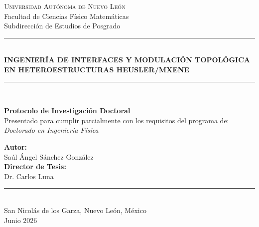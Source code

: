 \documentclass[12pt, letterpaper]{article}
\begin{document}
\begin{titlepage}
    \centering
    \vspace*{0.5cm}
    
    {\scshape\LARGE Universidad Autónoma de Nuevo León} \\
    \vspace{0.4cm}
    {\large Facultad de Ciencias Físico Matemáticas} \\
    \vspace{0.2cm}
    {\large Subdirección de Estudios de Posgrado} \\
    
    \vspace{1.5cm}
    
    \rule{\linewidth}{1mm} \\
    \vspace{0.4cm}
    {\Large\bfseries INGENIERÍA DE INTERFACES Y MODULACIÓN TOPOLÓGICA EN HETEROESTRUCTURAS HEUSLER/MXENE} \\
    \vspace{0.3cm}
    \rule{\linewidth}{1mm} \\
    
    \vspace{1.5cm}
    
    {\large\bfseries Protocolo de Investigación Doctoral} \\
    \vspace{0.3cm}
    {\large Presentado para cumplir parcialmente con los requisitos del programa de:} \\
    {\large\itshape Doctorado en Ingeniería Física} \\
    
    \vspace{2.0cm}
    
    \begin{minipage}{0.85\textwidth}
        \centering
        \large
        \textbf{Autor:} \\
        Saúl Ángel Sánchez González \\
        \vspace{0.8cm}
        \textbf{Director de Tesis:} \\
        Dr. Carlos Luna
    \end{minipage}
    
    \vfill
    
    \rule{0.5\linewidth}{0.2pt} \\
    \vspace{0.2cm}
    {\small San Nicolás de los Garza, Nuevo León, México \\ Junio 2026}
\end{titlepage}
\end{document}
